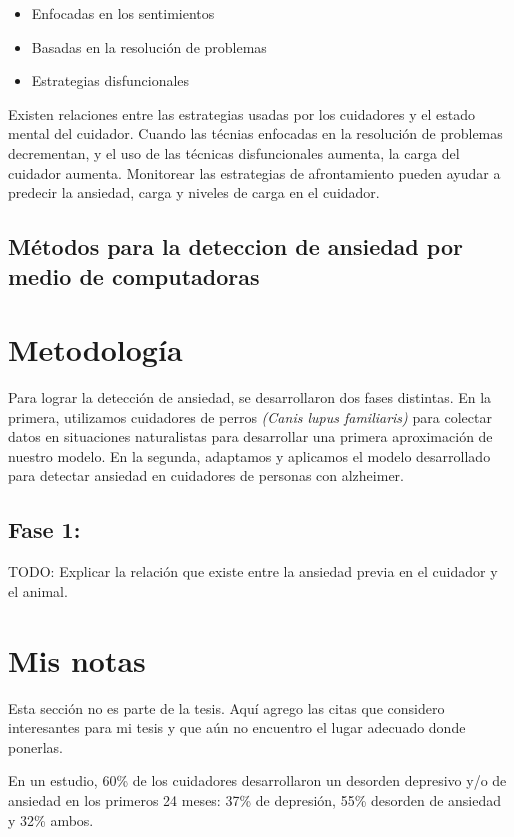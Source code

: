 \documentclass[letterpaper,12pt]{cicese}
\begin{document}
		\begin{itemize}
			\item Enfocadas en los sentimientos
			\item Basadas en la resoluci\'on de problemas
			\item Estrategias disfuncionales
		\end{itemize}
	
	Existen  relaciones entre las estrategias usadas por los cuidadores y el estado mental del cuidador. Cuando las t\'ecnias enfocadas en la resoluci\'on de problemas decrementan, y el uso de las t\'ecnicas disfuncionales aumenta, la carga del cuidador aumenta. Monitorear las estrategias de afrontamiento pueden ayudar a predecir la ansiedad, carga y niveles de carga en el cuidador\citep{Tutar2013P484}. 
	\section{M\'etodos para la deteccion de ansiedad por medio de computadoras}
	
	\newpage
		\chapter{Metodolog\'ia}
		Para lograr la detecci\'on de ansiedad, se desarrollaron dos fases distintas. En la primera, utilizamos cuidadores de perros \textit{(Canis lupus familiaris)} para colectar datos en situaciones naturalistas para desarrollar una primera aproximaci\'on de nuestro modelo. En la segunda, adaptamos y aplicamos el modelo desarrollado para detectar ansiedad en cuidadores de personas con alzheimer.
		\section{Fase 1:} 
			TODO: Explicar la relaci\'on que existe entre la ansiedad previa en el cuidador y el animal.
			
	\newpage
		\chapter{Mis notas}
			Esta secci\'on no es parte de la tesis. Aqu\'i agrego las citas que considero interesantes para mi tesis y que a\'un no encuentro el lugar adecuado donde ponerlas.

	
	
		En un estudio, 60\% de los cuidadores desarrollaron un desorden depresivo y/o de ansiedad en los primeros 24 meses: 37\% de depresi\'on, 55\% desorden de ansiedad y 32\% ambos. \citep{Joling2014}
\end{document}
